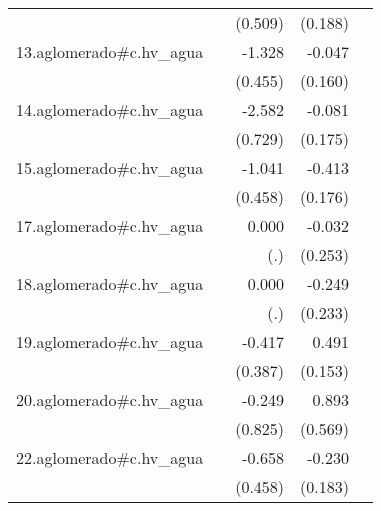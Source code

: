 {\begin{longtable}{l*{4}{D{.}{.}{-1}}}
            &                     &     (0.509)         &     (0.188)         &                     \\
\addlinespace
13.aglomerado#c.hv\_agua&                     &      -1.328\sym{**} &      -0.047         &                     \\
            &                     &     (0.455)         &     (0.160)         &                     \\
\addlinespace
14.aglomerado#c.hv\_agua&                     &      -2.582\sym{***}&      -0.081         &                     \\
            &                     &     (0.729)         &     (0.175)         &                     \\
\addlinespace
15.aglomerado#c.hv\_agua&                     &      -1.041\sym{*}  &      -0.413\sym{*}  &                     \\
            &                     &     (0.458)         &     (0.176)         &                     \\
\addlinespace
17.aglomerado#c.hv\_agua&                     &       0.000         &      -0.032         &                     \\
            &                     &         (.)         &     (0.253)         &                     \\
\addlinespace
18.aglomerado#c.hv\_agua&                     &       0.000         &      -0.249         &                     \\
            &                     &         (.)         &     (0.233)         &                     \\
\addlinespace
19.aglomerado#c.hv\_agua&                     &      -0.417         &       0.491\sym{**} &                     \\
            &                     &     (0.387)         &     (0.153)         &                     \\
\addlinespace
20.aglomerado#c.hv\_agua&                     &      -0.249         &       0.893         &                     \\
            &                     &     (0.825)         &     (0.569)         &                     \\
\addlinespace
22.aglomerado#c.hv\_agua&                     &      -0.658         &      -0.230         &                     \\
            &                     &     (0.458)         &     (0.183)         &                     \\

\end{longtable}}
